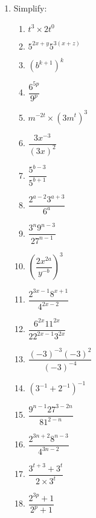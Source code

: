 \begin{eocexercises}{}
  \begin{enumerate}[label=\textbf{\arabic*}., itemsep=5pt]
  \item Simplify:
    \begin{multicols}{2}
      \begin{enumerate}[label=\textbf{(\alph*)}, itemsep=7pt]
      \item $ t^3 \times 2t^0 $
      \item $ 5^{2x+y} 5^{3(x+z)} $
      \item $ (b^{k+1})^k $
      \item $ \dfrac{6^{5p}}{9^p} $
      \item $ m^{-2t} \times (3m^t)^3 $
      \item $\dfrac{3{x}^{-3}}{{(3x)}^{2}}$
      \item $\dfrac{{5}^{b-3}}{{5}^{b+1}}$
      \item $\dfrac{{2}^{a-2} {3}^{a+3}}{{6}^{a}}$
      \item $\dfrac{{3}^{n} {9}^{n-3}}{{27}^{n-1}}$
      \item ${\left(\dfrac{2{x}^{2a}}{{y}^{-b}}\right)}^{3}$
      \item $\dfrac{{2}^{3x-1} {8}^{x+1}}{{4}^{2x-2}}$
      \item $\dfrac{{6}^{2x} {11}^{2x}}{{22}^{2x-1} {3}^{2x}}$
      \item $\dfrac{{(-3)}^{-3} {(-3)}^{2}}{{(-3)}^{-4}}$
      \item ${({3}^{-1}+{2}^{-1})}^{-1}$
      \item $\dfrac{{9}^{n-1} {27}^{3-2n}}{{81}^{2-n}}$
      \item $\dfrac{{2}^{3n+2} {8}^{n-3}}{{4}^{3n-2}}$
      \item $\dfrac{3^{t+3} + 3^t}{2 \times 3^t} $
      \item $\dfrac{2^{3p} +1}{2^p + 1} $
      \end{enumerate}
    \end{multicols}


\end{enumerate}
\end{eocexercises}
